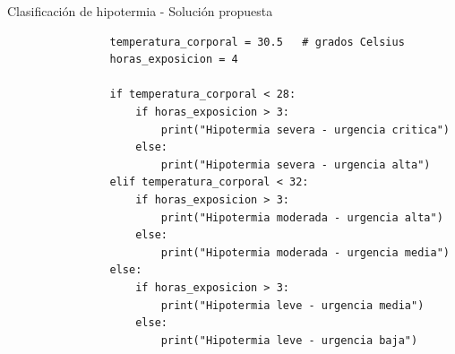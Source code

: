 \documentclass{beamer}
\begin{document}
    \begin{frame}[fragile,t]{Clasificación de hipotermia - Solución propuesta}
        \begin{verbatim}
                temperatura_corporal = 30.5   # grados Celsius
                horas_exposicion = 4

                if temperatura_corporal < 28:
                    if horas_exposicion > 3:
                        print("Hipotermia severa - urgencia critica")
                    else:
                        print("Hipotermia severa - urgencia alta")
                elif temperatura_corporal < 32:
                    if horas_exposicion > 3:
                        print("Hipotermia moderada - urgencia alta")
                    else:
                        print("Hipotermia moderada - urgencia media")
                else:
                    if horas_exposicion > 3:
                        print("Hipotermia leve - urgencia media")
                    else:
                        print("Hipotermia leve - urgencia baja")
        \end{verbatim}
    \end{frame}
    
\end{document}
